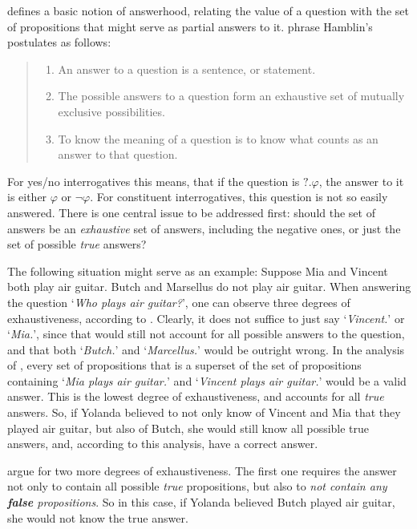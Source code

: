 \documentclass[notitlepage,twoside,a4paper]{scrreprt}
\newcommand{\stress}{\textbf} %
\newcommand{\example}[1]{`\textit{#1}'} %
\newenvironment{quotes}{\begin{quote}\sf}{\rm\end{quote}}
\theoremstyle{remark}
\theoremstyle{remark}
\theoremstyle{definition}
\theoremstyle{definition}
\begin{document}
\cite{hamblin:q} defines a basic notion of answerhood, relating the value of
a question with the set of propositions that might serve as partial answers to
it. \cite{gs:q} phrase Hamblin’s postulates as follows:

\begin{quotes}
  \begin{enumerate}
    \item An answer to a question is a sentence, or statement.
    \item The possible answers to a question form an exhaustive set of mutually
    exclusive possibilities.
    \item To know the meaning of a question is to know what counts as an answer to
    that question.
  \end{enumerate}
\end{quotes}


For yes/no interrogatives this means, that if the question is $?.\varphi$, the
answer to it is either $\varphi$ or $\neg\varphi$. For constituent
interrogatives, this question is not so easily answered.  There is one central
issue to be addressed first: should the set of answers be an \emph{exhaustive}
set of answers, including the negative ones, or just the set of possible
\emph{true} answers?

The following situation might serve as an example: Suppose Mia and Vincent both
play air guitar. Butch and Marsellus do not play air guitar. When answering the
question \example{Who plays air guitar?}, one can observe three degrees of
exhaustiveness, according to \cite[section 1.5]{gs:sawhq}. Clearly, it does not
suffice to just say \example{Vincent.} or \example{Mia.}, since that would still
not account for all possible answers to the question, and that both
\example{Butch.} and \example{Marcellus.} would be outright wrong. In the
analysis of \cite{karttunen:1977}, every set of propositions that is a superset
of the set of propositions containing \example{Mia plays air guitar.} and
\example{Vincent plays air guitar.} would be a valid answer. This is the lowest
degree of exhaustiveness, and accounts for all \emph{true} answers. So, if
Yolanda believed to not only know of Vincent and Mia that they played air
guitar, but also of Butch, she would still know all possible true answers, and,
according to this analysis, have a correct answer.

\cite{gs:sqpa} argue for two more degrees of exhaustiveness. The first
one requires the answer not only to contain all possible \emph{true}
propositions, but also to \emph{not contain any \stress{false} propositions}. So
in this case, if Yolanda believed Butch played air guitar, she would not know
the true answer.
\end{document}
